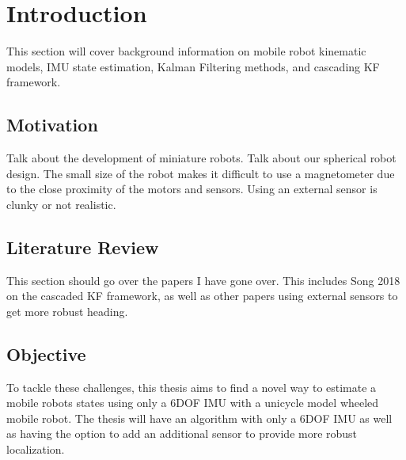 \chapter{Introduction}		%
\label{introchap}		%

This section will cover background information on mobile robot kinematic models,
IMU state estimation, Kalman Filtering methods, and cascading KF framework. 


\section{Motivation}

Talk about the development of miniature robots. Talk about our spherical robot design.
The small size of the robot makes it difficult to use a magnetometer due to the close
proximity of the motors and sensors. Using an external sensor is clunky or not
realistic. 

\section{Literature Review}

This section should go over the papers I have gone over. This includes 
Song 2018 on the cascaded KF framework, as well as other papers using external 
sensors to get more robust heading. 

\section{Objective}

To tackle these challenges, this thesis aims to find a novel way to estimate
a mobile robots states using only a 6DOF IMU with a unicycle model wheeled mobile 
robot. The thesis will have an algorithm with only a 6DOF IMU as well as having the
option to add an additional sensor to provide more robust localization.


